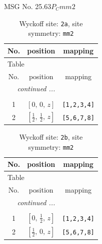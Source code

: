 \documentclass[fleqn,8pt]{jsarticle}
\begin{document}
\setcounter{MaxMatrixCols}{32}

\renewcommand{\tablename}{Table~}
\renewcommand{\figurename}{Figure~}
\begin{center}
\LARGE
MSG No. 25.63\quad$P_{C}mm2$
\end{center}
\renewcommand{\arraystretch}{1.2}
\begin{longtable}{ccc}
\caption{Wyckoff site: {\tt 2a}, site symmetry: {\tt mm2}}
 \\
 \hline \hline
No. & position & mapping \\ \hline \endfirsthead

\multicolumn{2}{l}{\tablename\ \thetable{}} \\
 \hline \hline
No. & position & mapping \\ \hline \endhead

 \hline \hline
\multicolumn{2}{r}{\footnotesize\it continued ...} \\ \endfoot

 \hline \hline
\multicolumn{2}{r}{} \\ \endlastfoot

1 & $\left[ 0,\, 0,\, z \right]$ & {\tt [1,2,3,4]} \\ \hline
2 & $\left[ \frac{1}{2},\, \frac{1}{2},\, z \right]$ & {\tt [5,6,7,8]} \\
\end{longtable}
\renewcommand{\arraystretch}{1.2}
\begin{longtable}{ccc}
\caption{Wyckoff site: {\tt 2b}, site symmetry: {\tt mm2}}
 \\
 \hline \hline
No. & position & mapping \\ \hline \endfirsthead

\multicolumn{2}{l}{\tablename\ \thetable{}} \\
 \hline \hline
No. & position & mapping \\ \hline \endhead

 \hline \hline
\multicolumn{2}{r}{\footnotesize\it continued ...} \\ \endfoot

 \hline \hline
\multicolumn{2}{r}{} \\ \endlastfoot

1 & $\left[ 0,\, \frac{1}{2},\, z \right]$ & {\tt [1,2,3,4]} \\ \hline
2 & $\left[ \frac{1}{2},\, 0,\, z \right]$ & {\tt [5,6,7,8]} \\
\end{longtable}
\renewcommand{\arraystretch}{1.2}
\end{document}
